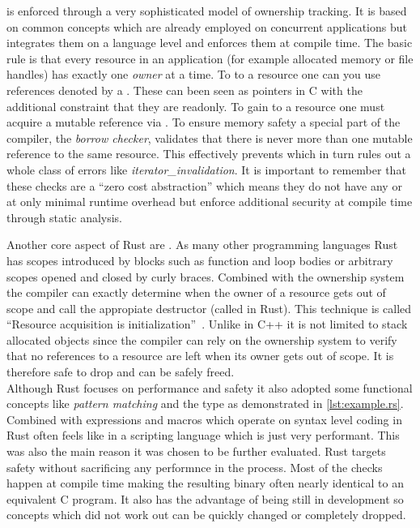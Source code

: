  is enforced through a very sophisticated model of ownership tracking. It is based on common concepts which are already employed on concurrent applications but integrates them on a language level and enforces them at compile time. The basic rule is that every resource in an application (for example allocated memory or file handles) has exactly one \textit{owner} at a time. To  to a resource one can you use references denoted by a \shinline{\&}. These can been seen as pointers in C with the additional constraint that they are readonly. To gain  to a resource one must acquire a mutable reference via . To ensure memory safety a special part of the compiler, the \textit{borrow checker}, validates that there is never more than one mutable reference to the same resource. This effectively prevents  which in turn rules out a whole class of errors like \textit{\gls{iterator_invalidation}}. It is important to remember that these checks are a ``zero cost abstraction'' which means they do not have any or at only minimal runtime overhead but enforce additional security at compile time through static analysis.

Another core aspect of Rust are . As many other programming languages Rust has scopes introduced by blocks such as function and loop bodies or arbitrary scopes opened and closed by curly braces. Combined with the ownership system the compiler can exactly determine when the owner of a resource gets out of scope and call the appropiate destructor (called  in Rust). This technique is called ``Resource acquisition is initialization''~\cite[p. 389]{evolution_c++}. Unlike in C++ it is not limited to stack allocated objects since the compiler can rely on the ownership system to verify that no references to a resource are left when its owner gets out of scope. It is therefore safe to drop and can be safely freed.
\\


Although Rust focuses on performance and safety it also adopted some functional concepts like \textit{pattern matching} and the  type as demonstrated in \autoref{lst:example.rs}. Combined with  expressions and macros which operate on syntax level coding in Rust often feels like in a scripting language which is just very performant. This was also the main reason it was chosen to be further evaluated. Rust targets safety without sacrificing any performnce in the process. Most of the checks happen at compile time making the resulting binary often nearly identical to an equivalent C program. It also has the advantage of being still in development so concepts which did not work out can be quickly changed or completely dropped.

